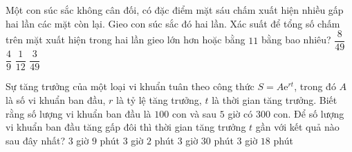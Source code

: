   \begin{ex}%
	Một con súc sắc không cân đối, có đặc điểm mặt sáu chấm xuất hiện nhiều gấp hai lần các mặt còn lại. Gieo con súc sắc đó hai lần. Xác suất để tổng số chấm trên mặt xuất hiện trong hai lần gieo lớn hơn hoặc bằng $11$ bằng bao nhiêu?
	\choice
	{\True $\dfrac{8}{49} $}
	{$\dfrac{4}{9} $}
	{$\dfrac{1}{12} $}
	{$\dfrac{3}{49} $}
	
\end{ex}

  \begin{ex}%
	Sự tăng trưởng của một loại vi khuẩn tuân theo công thức $S=A\mathrm{e}^{rt}$, trong đó $A$ là số vi khuẩn ban đầu, $r$ là tỷ lệ tăng trưởng, $t$ là thời gian tăng trưởng. Biết rằng số lượng vi khuẩn ban đầu là $100$ con và sau $5$ giờ có $300$ con. Để số lượng vi khuẩn ban đầu tăng gấp đôi thì thời gian tăng trưởng $t$ gần với kết quả nào sau đây nhất?
	\choice
	{\True $3$ giờ $9$ phút}
	{$3$ giờ $2$ phút}
	{$3$ giờ $30$ phút}
	{$3$ giờ $18$ phút}
	
\end{ex}

